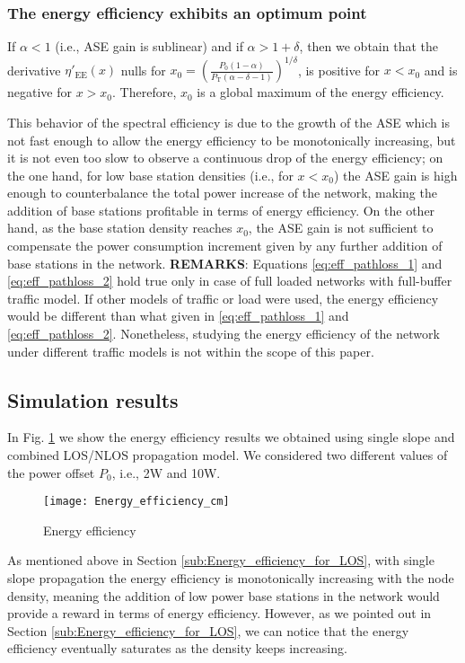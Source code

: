 \documentclass[twocoumn]{IEEEtran}
\begin{document}
\subsubsection{The energy efficiency exhibits an optimum point}	
If $\alpha<1$ (i.e., ASE gain is sublinear) and if $\alpha>1+\delta$, then we obtain that the derivative $\eta\prime_{\mathrm{EE}}(x)$
nulls for $x_{0}=\left(\frac{P_{0}\left(1-\alpha\right)}{P_{\mathrm{T}}\left(\alpha-\delta-1\right)}\right)^{1/\delta}$, is positive for $x<x_0$ and is negative for $x>x_0$. Therefore, $x_0$ is a global maximum of the energy efficiency. 

This behavior of the spectral efficiency is due to the growth of the ASE which is not fast enough to allow the energy efficiency to be monotonically increasing, but it is not even too slow to observe a continuous drop of the energy efficiency; on the one hand, for low base station densities  (i.e., for $x<x_0$) the ASE gain is high enough to counterbalance the total power increase of the network, making the addition of base stations profitable in terms of energy efficiency. On the other hand, as the base station density reaches $x_0$, the ASE gain is not sufficient to compensate the power consumption increment given by any further addition of base stations in the network.
\textbf{REMARKS}: Equations \eqref{eq:eff_pathloss_1} and \eqref{eq:eff_pathloss_2}
hold true only in case of full loaded networks with full-buffer traffic
model. If other models of traffic or load were used, the energy efficiency
would be different than what given in \eqref{eq:eff_pathloss_1} and
\eqref{eq:eff_pathloss_2}. Nonetheless, studying the energy efficiency
of the network under different traffic models is not within the scope
of this paper.

\vspace{-3mm}
\subsection{Simulation results} \label{sub:Energy-efficiency_results}

In Fig. \ref{fig:energy_efficiency} we show the energy efficiency
results we obtained using single slope and combined LOS/NLOS propagation
model. We considered two different values of the power offset $P_0$, i.e., 2W and 10W. 
\begin{figure}
\centering 
\texttt{[image: Energy\_efficiency\_cm]}
\caption{Energy efficiency}
\label{fig:energy_efficiency}
\vspace{-5mm}
\end{figure}
As mentioned above in Section \ref{sub:Energy_efficiency_for_LOS},
with single slope propagation the energy efficiency is monotonically
increasing with the node density, meaning the addition of low power
base stations in the network would provide a reward in terms of energy
efficiency. However, as we pointed out in Section \ref{sub:Energy_efficiency_for_LOS}, we can notice that the energy efficiency eventually saturates as the density keeps increasing. 
\end{document}
